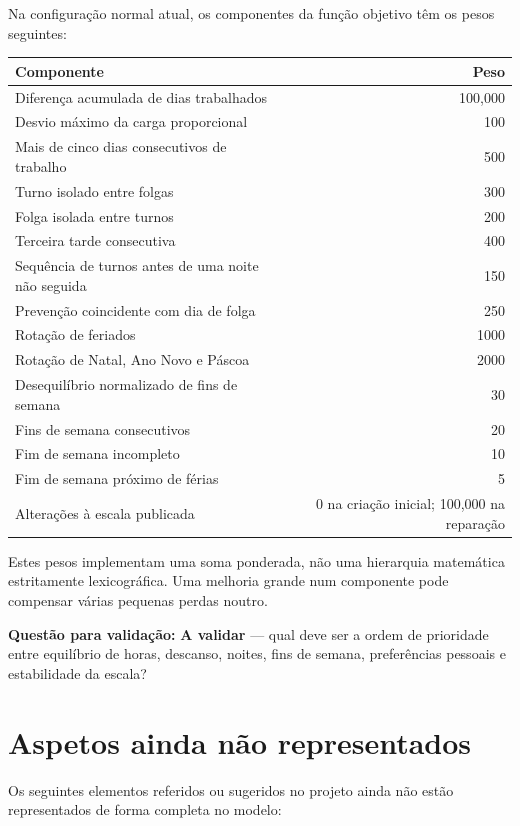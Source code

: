 \documentclass[11pt,a4paper]{article}
\newcommand{\validar}{\textcolor{blue!70!black}{\textbf{A validar}}}
\begin{document}
Na configuração normal atual, os componentes da função objetivo têm os pesos
seguintes:

\begin{center}
\begin{tabular}{lr}
\toprule
\textbf{Componente} & \textbf{Peso} \\
\midrule
Diferença acumulada de dias trabalhados & 100,000 \\
Desvio máximo da carga proporcional & 100 \\
Mais de cinco dias consecutivos de trabalho & 500 \\
Turno isolado entre folgas & 300 \\
Folga isolada entre turnos & 200 \\
Terceira tarde consecutiva & 400 \\
Sequência de turnos antes de uma noite não seguida & 150 \\
Prevenção coincidente com dia de folga & 250 \\
Rotação de feriados & 1000 \\
Rotação de Natal, Ano Novo e Páscoa & 2000 \\
Desequilíbrio normalizado de fins de semana & 30 \\
Fins de semana consecutivos & 20 \\
Fim de semana incompleto & 10 \\
Fim de semana próximo de férias & 5 \\
Alterações à escala publicada & 0 na criação inicial; 100,000 na reparação \\
\bottomrule
\end{tabular}
\end{center}

Estes pesos implementam uma soma ponderada, não uma hierarquia matemática
estritamente lexicográfica. Uma melhoria grande num componente pode compensar
várias pequenas perdas noutro.

\textbf{Questão para validação:} \validar{} --- qual deve ser a ordem de
prioridade entre equilíbrio de horas, descanso, noites, fins de semana,
preferências pessoais e estabilidade da escala?

\section{Aspetos ainda não representados}

Os seguintes elementos referidos ou sugeridos no projeto ainda não estão
representados de forma completa no modelo:
\end{document}
